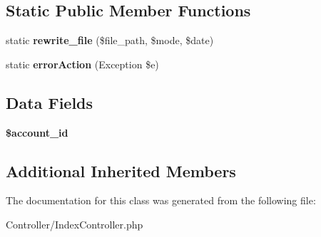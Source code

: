 \subsection*{Static Public Member Functions}
\begin{DoxyCompactItemize}
\item 
\hypertarget{class_index_controller_ab012c36512fb8f752dc919c64fb34648}{static {\bfseries rewrite\-\_\-file} (\$file\-\_\-path, \$mode, \$date)}\label{class_index_controller_ab012c36512fb8f752dc919c64fb34648}

\item 
\hypertarget{class_index_controller_a6d61d9eb88e39e2836595360d509c4f3}{static {\bfseries error\-Action} (Exception \$e)}\label{class_index_controller_a6d61d9eb88e39e2836595360d509c4f3}

\end{DoxyCompactItemize}
\subsection*{Data Fields}
\begin{DoxyCompactItemize}
\item 
\hypertarget{class_index_controller_a7c3eb7a98818df12bc88e63ac7ea9c63}{{\bfseries \$account\-\_\-id}}\label{class_index_controller_a7c3eb7a98818df12bc88e63ac7ea9c63}

\end{DoxyCompactItemize}
\subsection*{Additional Inherited Members}


The documentation for this class was generated from the following file\-:\begin{DoxyCompactItemize}
\item 
Controller/Index\-Controller.\-php\end{DoxyCompactItemize}
